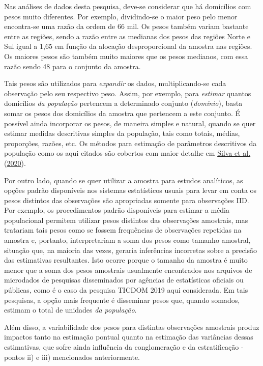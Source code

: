 \documentclass[
  12pt,
  brazilian,
]{book}
\theoremstyle{definition}
\theoremstyle{definition}
\theoremstyle{definition}
\theoremstyle{definition}
\theoremstyle{remark}
\begin{document}
Nas análises de dados desta pesquisa, deve-se considerar que há domicílios com pesos muito diferentes. Por exemplo, dividindo-se o maior peso pelo menor encontra-se uma razão da ordem de 66 mil. Os pesos também variam bastante entre as regiões, sendo a razão entre as medianas dos pesos das regiões Norte e Sul igual a 1,65 em função da alocação desproporcional da amostra nas regiões. Os maiores pesos são também muito maiores que os pesos medianos, com essa razão sendo 48 para o conjunto da amostra.

Tais pesos são utilizados para \emph{expandir} os dados, multiplicando-se cada observação pelo seu respectivo peso. Assim, por exemplo, para \emph{estimar}
quantos domicílios \emph{da população} pertencem a determinado conjunto (\emph{domínio}), basta somar os pesos dos domicílios da amostra que pertencem a este conjunto. É possível ainda incorporar os pesos, de maneira simples e natural, quando se quer estimar medidas descritivas simples da população, tais como totais, médias, proporções, razões, etc. Os métodos para estimação de parâmetros descritivos da população como os aqui citados são cobertos com maior detalhe em \protect\hyperlink{ref-Silva2020}{Silva et al.} (\protect\hyperlink{ref-Silva2020}{2020}).

Por outro lado, quando se quer utilizar a amostra para estudos analíticos, as
opções padrão disponíveis nos sistemas estatísticos usuais para levar em conta os pesos distintos das observações são apropriadas somente para observações IID. Por exemplo, os procedimentos padrão disponíveis para estimar a média populacional permitem utilizar pesos distintos das observações amostrais, mas tratariam tais pesos como se fossem frequências de observações repetidas na amostra e, portanto, interpretariam a soma dos pesos como tamanho amostral, situação que, na maioria das vezes, geraria inferências incorretas sobre a precisão das estimativas resultantes. Isto ocorre porque o tamanho da amostra é muito menor que a soma dos pesos amostrais usualmente encontrados nos arquivos de microdados de pesquisas disseminados por agências de estatísticas oficiais ou públicas, como é o caso da pesquisa TICDOM 2019 aqui considerada. Em tais pesquisas, a opção mais frequente é disseminar pesos que, quando somados, estimam o total de unidades \emph{da população}.

Além disso, a variabilidade dos pesos para distintas observações amostrais
produz impactos tanto na estimação pontual quanto na estimação das variâncias dessas estimativas, que sofre ainda influência da conglomeração e da estratificação - pontos ii) e iii) mencionados anteriormente.
\end{document}
